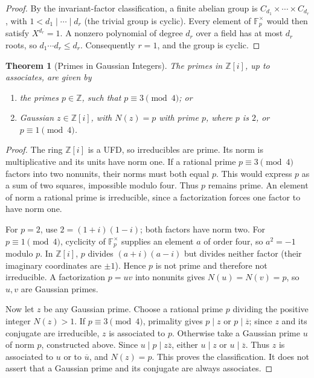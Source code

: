 \documentclass{article}
\newtheorem{theorem}{Theorem}[section]
\theoremstyle{definition}
\theoremstyle{remark}
\newcommand{\pqty}[1]{\left(#1\right)}
\newcommand{\bqty}[1]{\left[#1\right]}
\newcommand{\ZZ}{\mathbb{Z}}
\begin{document}
\begin{proof}
By the invariant-factor classification, a finite abelian group is
$C_{d_1}\times\cdots\times C_{d_r}$, with $1<d_1\mid\cdots\mid d_r$ (the trivial group is cyclic).
Every element of $\mathbb F_p^\times$ would then satisfy $X^{d_r}=1$.
A nonzero polynomial of degree $d_r$ over a field has at most $d_r$ roots, so
$d_1\cdots d_r\leq d_r$. Consequently $r=1$, and the group is cyclic.
\end{proof}

\begin{theorem}[Primes in Gaussian Integers]
    \label{thm:prime-gaussian}%
    The primes in \(\ZZ\bqty{i}\), up to associates, are given by
    \begin{enumerate}
        \item the primes \(p \in \ZZ\), such that \(p \equiv 3 \pmod{4}\); or
        \item Gaussian \(z \in \ZZ\bqty{i}\), with \(N\pqty{z} = p\) with prime \(p\), where \(p\) is \(2\), or \(p \equiv 1 \pmod{4}\).
    \end{enumerate}
\end{theorem}

\begin{proof}
The ring $\mathbb Z[i]$ is a UFD, so irreducibles are prime. Its norm is multiplicative and its units have norm one.
If a rational prime $p\equiv3\pmod4$ factors into two nonunits, their norms must both equal $p$. This would express $p$ as a sum of two squares, impossible modulo four. Thus $p$ remains prime.
An element of norm a rational prime is irreducible, since a factorization forces one factor to have norm one.

For $p=2$, use $2=(1+i)(1-i)$; both factors have norm two.
For $p\equiv1\pmod4$, cyclicity of $\mathbb F_p^\times$ supplies an element $a$ of order four, so $a^2=-1$ modulo $p$. In $\mathbb Z[i]$, $p$ divides $(a+i)(a-i)$ but divides neither factor (their imaginary coordinates are $\pm1$). Hence $p$ is not prime and therefore not irreducible. A factorization $p=uv$ into nonunits gives $N(u)=N(v)=p$, so $u,v$ are Gaussian primes.

Now let $z$ be any Gaussian prime. Choose a rational prime $p$ dividing the positive integer $N(z)>1$.
If $p\equiv3\pmod4$, primality gives $p\mid z$ or $p\mid\overline z$; since $z$ and its conjugate are irreducible, $z$ is associated to $p$.
Otherwise take a Gaussian prime $u$ of norm $p$, constructed above. Since $u\mid p\mid z\overline z$, either $u\mid z$ or $u\mid\overline z$.
Thus $z$ is associated to $u$ or to $\overline u$, and $N(z)=p$.
This proves the classification. It does not assert that a Gaussian prime and its conjugate are always associates.
\end{proof}
\end{document}

